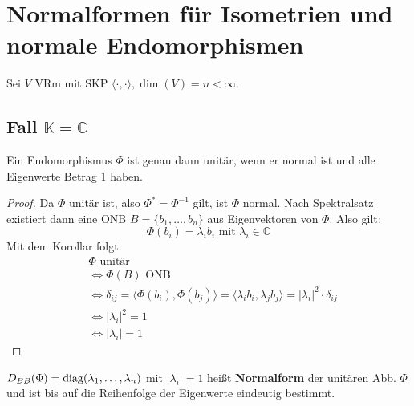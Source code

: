 \documentclass[parskip,a4paper,twoside,DIV15,BCOR12mm]{scrbook}
\begin{document}
\section{Normalformen für Isometrien und normale Endomorphismen}
Sei $V$ VRm mit SKP $\langle\cdot,\cdot\rangle, \dim(V)=n<\infty$.

\subsection{Fall $\mathbb{K}=\mathbb{C}$}
\begin{lemma}
Ein Endomorphismus $\Phi$ ist genau dann unitär, wenn er normal ist und alle Eigenwerte 
Betrag 1 haben.
\end{lemma}

\begin{proof}
Da $\Phi$ unitär ist, also $\Phi^*=\Phi^{-1}$ gilt, ist $\Phi$ normal. 
Nach Spektralsatz existiert dann eine ONB $B=\{b_1,\ldots,b_n\}$ aus Eigenvektoren von $\Phi$.
Also gilt: 
\[\Phi(b_i)=\lambda_i b_i \text{ mit } \lambda_i\in\mathbb{C}\]
Mit dem Korollar folgt:\\
\begin{align*}
&\Phi \text{ unitär}\\
&\iff \Phi(B) \text{ ONB}\\
&\iff \delta_{ij}=\langle\Phi(b_i),\Phi(b_j)\rangle=\langle\lambda_i b_i,\lambda_j b_j\rangle
=|\lambda_i|^2\cdot\delta_{ij}\\
&\iff |\lambda_i|^2=1\\
&\iff |\lambda_i|=1
\end{align*}
\end{proof}

\begin{conclusion}
$D_{BB}(\Phi)=\operatorname{diag}(\lambda_1,\ldots,\lambda_n)$ mit $|\lambda_i|=1$ heißt \textbf{Normalform}
der unitären Abb. $\Phi$ und ist bis auf die Reihenfolge der Eigenwerte eindeutig bestimmt.
\end{conclusion}
\end{document}
